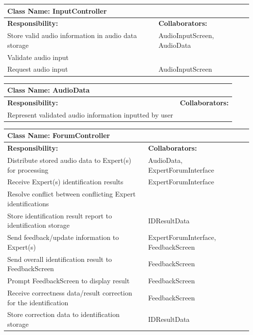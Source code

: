\documentclass[]{article}
\begin{document}
	\begin{table}[ht]
		\centering
		\begin{tabular}{|p{5cm}|p{5cm}|}
		\hline 
		 \multicolumn{2}{|l|}{\textbf{Class Name: InputController}} \\
		\hline
		\textbf{Responsibility:} & \textbf{Collaborators:} \\
		\hline
		Store valid audio information in audio data storage & AudioInputScreen, AudioData \\
		\hline
		Validate audio input &  \\
		\hline
		Request audio input & AudioInputScreen \\
		\hline
		\end{tabular}
	\end{table}
	
	\begin{table}[ht]
		\centering
		\begin{tabular}{|p{5cm}|p{5cm}|}
		\hline 
		 \multicolumn{2}{|l|}{\textbf{Class Name: AudioData}} \\
		\hline
		\textbf{Responsibility:} & \textbf{Collaborators:} \\
		\hline
		Represent validated audio information inputted by user & \\
		\hline
		\end{tabular}
	\end{table}
	
\newpage
	\begin{table}[ht]
		\centering
		\begin{tabular}{|p{5cm}|p{5cm}|}
		\hline 
		 \multicolumn{2}{|l|}{\textbf{Class Name: ForumController}} \\
		\hline
		\textbf{Responsibility:} & \textbf{Collaborators:} \\
		\hline
		Distribute stored audio data to Expert(s) for processing & AudioData, ExpertForumInterface \\
		\hline
		Receive Expert(s) identification results & ExpertForumInterface \\
		\hline
		Resolve conflict between conflicting Expert identifications & \\
		\hline
		Store identification result report to identification storage & IDResultData \\
		\hline
		Send feedback/update information to Expert(s) & ExpertForumInterface, FeedbackScreen \\
		\hline
		Send overall identification result to FeedbackScreen & FeedbackScreen \\
		\hline
		Prompt FeedbackScreen to display result & FeedbackScreen \\
		\hline
		Receive correctness data/result correction for the identification & FeedbackScreen \\
		\hline
		Store correction data to identification storage & IDResultData \\
		\hline
		\end{tabular}
	\end{table}
	
\end{document}
